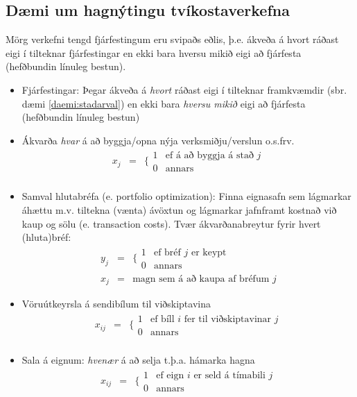 \subsection*{Dæmi um hagnýtingu tvíkostaverkefna}
Mörg verkefni tengd fjárfestingum eru svipaðs eðlis, þ.e. ákveða á hvort ráðast eigi í tilteknar fjárfestingar en ekki bara hversu mikið eigi að fjárfesta (hefðbundin línuleg bestun).
\begin{itemize}
  \item Fjárfestingar: Þegar ákveða á \emph{hvort} ráðast eigi í tilteknar framkvæmdir (sbr. dæmi \ref{daemi:stadarval}) en ekki bara \emph{hversu mikið} eigi að fjárfesta (hefðbundin línuleg bestun)
  \item Ákvarða \emph{hvar} á að byggja/opna nýja verksmiðju/verslun o.s.frv.
  \begin{eqnarray*}
    x_j&=&\Bigg\{\begin{array}{cl} 1 & \mbox{ef á að byggja á stað }j\\0 & \mbox{annars}\end{array}\\
  \end{eqnarray*}
  \item Samval hlutabréfa (e. portfolio optimization): Finna eignasafn sem lágmarkar áhættu m.v. tiltekna (vænta) ávöxtun og lágmarkar jafnframt kostnað við kaup og sölu (e. transaction costs). Tvær ákvarðanabreytur fyrir hvert (hluta)bréf:
  \begin{eqnarray*}
    y_j&=&\Bigg\{\begin{array}{cl} 1 & \mbox{ef bréf }j\mbox{ er keypt}\\0 & \mbox{annars}\end{array}\\
    x_j&=&\mbox{magn sem á að kaupa af bréfum }j
  \end{eqnarray*}
  \item Vöruútkeyrsla á sendibílum til viðskiptavina
  \begin{eqnarray*}
    x_{ij}&=&\Bigg\{\begin{array}{cl} 1 & \mbox{ef bíll }i\mbox{ fer til viðskiptavinar }j\\0 & \mbox{annars}\end{array}\\
  \end{eqnarray*}
  \item Sala á eignum: \emph{hvenær} á að selja t.þ.a. hámarka hagna
  \begin{eqnarray*}
    x_{ij}&=&\Bigg\{\begin{array}{cl} 1 & \mbox{ef eign }i\mbox{ er seld á tímabili  }j\\0 & \mbox{annars}\end{array}\\

\end{eqnarray*}
\end{itemize}
